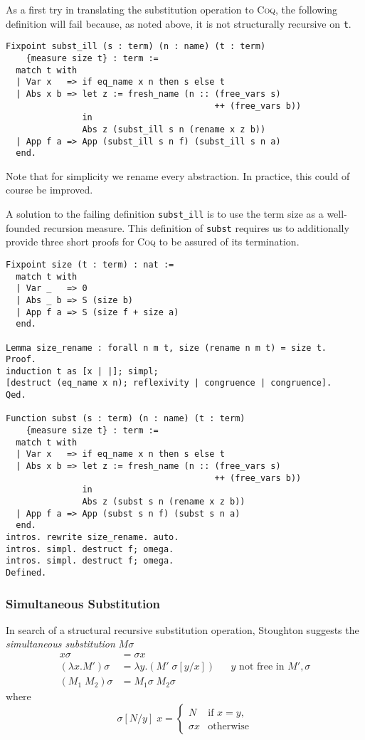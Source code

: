 \documentclass[a4paper,11pt]{article}
\newcommand{\name}[1]{\textsc{#1}\xspace}
\def\Coq{\name{Coq}}
\begin{document}
As a first try in translating the substitution operation to \Coq, the
following definition will fail because, as noted above, it is not
structurally recursive on \lstinline{t}.
\begin{lstlisting}
Fixpoint subst_ill (s : term) (n : name) (t : term)
    {measure size t} : term :=
  match t with
  | Var x   => if eq_name x n then s else t
  | Abs x b => let z := fresh_name (n :: (free_vars s)
                                         ++ (free_vars b))
               in
               Abs z (subst_ill s n (rename x z b))
  | App f a => App (subst_ill s n f) (subst_ill s n a)
  end.
\end{lstlisting}
Note that for simplicity we rename every abstraction. In practice,
this could of course be improved.

A solution to the failing definition \lstinline{subst_ill} is to use
the term size as a well-founded recursion
measure. This definition of \lstinline{subst} requires us to
additionally provide three short proofs for \Coq to be assured of its
termination.
\begin{lstlisting}
Fixpoint size (t : term) : nat :=
  match t with
  | Var _   => 0
  | Abs _ b => S (size b)
  | App f a => S (size f + size a)
  end.

Lemma size_rename : forall n m t, size (rename n m t) = size t.
Proof.
induction t as [x | |]; simpl;
[destruct (eq_name x n); reflexivity | congruence | congruence].
Qed.

Function subst (s : term) (n : name) (t : term)
    {measure size t} : term :=
  match t with
  | Var x   => if eq_name x n then s else t
  | Abs x b => let z := fresh_name (n :: (free_vars s)
                                         ++ (free_vars b))
               in
               Abs z (subst s n (rename x z b))
  | App f a => App (subst s n f) (subst s n a)
  end.
intros. rewrite size_rename. auto.
intros. simpl. destruct f; omega.
intros. simpl. destruct f; omega.
Defined.
\end{lstlisting}

\subsubsection*{Simultaneous Substitution}

In search of a structural recursive substitution operation, Stoughton
\cite{stoughton-88} suggests the {\em simultaneous substitution} $M \sigma$
\begin{align*}
  x \sigma              &= \sigma x\\
  (\lambda x.M') \sigma &= \lambda y.(M' \; \sigma[y/x])  && \text{$y$ not free in $M', \sigma$}\\
  (M_1 \; M_2) \sigma   &= M_1 \sigma \; M_2 \sigma
\end{align*}
where
\begin{equation*}
  \sigma[N/y] \; x =
  \begin{cases}
    N        & \text{if $x = y$,}\\
    \sigma x & \text{otherwise}
  \end{cases}
\end{equation*}
\end{document}

